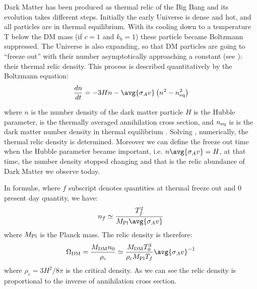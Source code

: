 Dark Matter has been produced as thermal relic of the Big Bang and its evolution takes different steps. Initially the early Universe is dense and hot, and all particles are in thermal equilibrium. With its cooling down to a temperature T below the DM mass (if $c=1$ and $k_b=1$) these particle became Boltzmann suppressed. The Universe is also expanding, so that DM particles are going to ``freeze out'' with their number asymptotically approaching a constant (see \Fig{\ref{fig:Freezeout}}): their thermal relic density. This process is described quantitatively by the Boltzmann equation:
\begin{equation}
\frac{dn}{dt}=-3Hn-\avg{\sigma_A v}\left(n^2-n_{\textup{eq}}^2\right)
\label{eqn:boltz}
\end{equation}

where $n$ is the number density of the dark matter particle $H$ is the Hubble parameter,  is the thermally averaged annihilation cross section, and $n_{\textup{eq}}$ is is the dark matter number density in thermal equilibrium \cite{feng:DM}. Solving \Eqn{\ref{eqn:boltz}}, numerically, the thermal relic density is determined. Moreover we can define the freeze out time when the Hubble parameter became important, i.e. $n\avg{\sigma_A v}= H$, at that time, the number density stopped changing and that is the relic abundance of Dark Matter we observe today.

In formul\ae, where $f$ subscript denotes quantities at thermal freeze out and $0$ present day quantity, we have:
\begin{equation}
	n_f\simeq\frac{T^2_f}{M_\textup{Pl}\avg{\sigma_A v}}
\end{equation}
where $M_\textup{Pl}$ is the Planck mass. The relic density is therefore:
\begin{equation}
	\Omega_\textup{DM}=\frac{M_\textup{DM}n_0}{\rho_c}\simeq\frac{M_\textup{DM}T_0^3}{\rho_c M_\textup{Pl} T_f}\avg{\sigma_A v}^{-1}
\end{equation}
where $\rho_c=3H^2/8\pi$ is the critical density. As we can see the relic density is proportional to the inverse of annihilation cross section.

